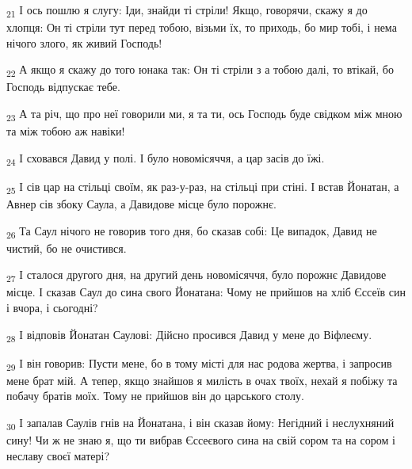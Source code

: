 \begin{tcolorbox}
\textsubscript{21} І ось пошлю я слугу: Іди, знайди ті стріли! Якщо, говорячи, скажу я до хлопця: Он ті стріли тут перед тобою, візьми їх, то приходь, бо мир тобі, і нема нічого злого, як живий Господь!
\end{tcolorbox}
\begin{tcolorbox}
\textsubscript{22} А якщо я скажу до того юнака так: Он ті стріли з а тобою далі, то втікай, бо Господь відпускає тебе.
\end{tcolorbox}
\begin{tcolorbox}
\textsubscript{23} А та річ, що про неї говорили ми, я та ти, ось Господь буде свідком між мною та між тобою аж навіки!
\end{tcolorbox}
\begin{tcolorbox}
\textsubscript{24} І сховався Давид у полі. І було новомісяччя, а цар засів до їжі.
\end{tcolorbox}
\begin{tcolorbox}
\textsubscript{25} І сів цар на стільці своїм, як раз-у-раз, на стільці при стіні. І встав Йонатан, а Авнер сів збоку Саула, а Давидове місце було порожнє.
\end{tcolorbox}
\begin{tcolorbox}
\textsubscript{26} Та Саул нічого не говорив того дня, бо сказав собі: Це випадок, Давид не чистий, бо не очистився.
\end{tcolorbox}
\begin{tcolorbox}
\textsubscript{27} І сталося другого дня, на другий день новомісяччя, було порожнє Давидове місце. І сказав Саул до сина свого Йонатана: Чому не прийшов на хліб Єссеїв син і вчора, і сьогодні?
\end{tcolorbox}
\begin{tcolorbox}
\textsubscript{28} І відповів Йонатан Саулові: Дійсно просився Давид у мене до Віфлеєму.
\end{tcolorbox}
\begin{tcolorbox}
\textsubscript{29} І він говорив: Пусти мене, бо в тому місті для нас родова жертва, і запросив мене брат мій. А тепер, якщо знайшов я милість в очах твоїх, нехай я побіжу та побачу братів моїх. Тому не прийшов він до царського столу.
\end{tcolorbox}
\begin{tcolorbox}
\textsubscript{30} І запалав Саулів гнів на Йонатана, і він сказав йому: Негідний і неслухняний сину! Чи ж не знаю я, що ти вибрав Єссеєвого сина на свій сором та на сором і неславу своєї матері?
\end{tcolorbox}
